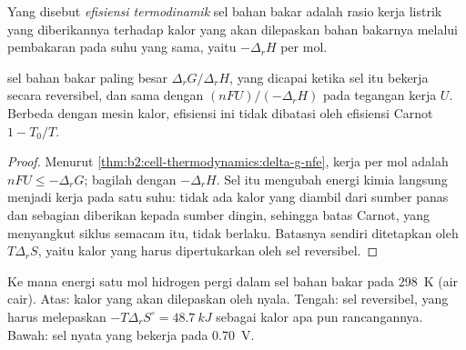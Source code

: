 \begin{definition}\label{def:b2:cell-thermodynamics:efficiency}
Yang disebut \emph{efisiensi termodinamik}
sel bahan bakar adalah rasio kerja listrik yang diberikannya terhadap
kalor yang akan dilepaskan bahan bakarnya melalui pembakaran pada suhu
yang sama, yaitu $-\Delta_r H$ per mol.
\end{definition}

\begin{proposition}\label{prop:b2:cell-thermodynamics:efficiency}
 sel bahan bakar paling besar $\Delta_r G/\Delta_r H$,
yang dicapai ketika sel itu bekerja secara reversibel, dan sama dengan
$(nFU)/(-\Delta_r H)$ pada tegangan kerja $U$. Berbeda dengan mesin kalor,
efisiensi ini tidak dibatasi oleh efisiensi Carnot $1 - T_0/T$.
\end{proposition}

\begin{proof}
Menurut \cref{thm:b2:cell-thermodynamics:delta-g-nfe}, kerja per mol
adalah $nFU \leq
-\Delta_r G$; bagilah dengan $-\Delta_r H$. Sel itu
mengubah energi kimia langsung menjadi kerja pada satu suhu: tidak ada
kalor yang diambil dari sumber panas dan sebagian diberikan kepada sumber
dingin, sehingga batas Carnot, yang menyangkut siklus semacam itu, tidak
berlaku. Batasnya sendiri ditetapkan oleh $T\Delta_r S$, yaitu kalor yang
harus dipertukarkan oleh sel reversibel.
\end{proof}

\begin{omfigure}

{\small Ke mana energi satu mol hidrogen pergi dalam sel bahan bakar pada
\qty{298}{K} (air cair). Atas: kalor yang akan dilepaskan oleh nyala.
Tengah: sel reversibel, yang harus melepaskan $-T\Delta_r S^\circ = \qty{48.7}{kJ}$ sebagai kalor apa pun rancangannya. Bawah: sel nyata yang
bekerja pada \qty{0.70}{V}.}
\end{omfigure}

